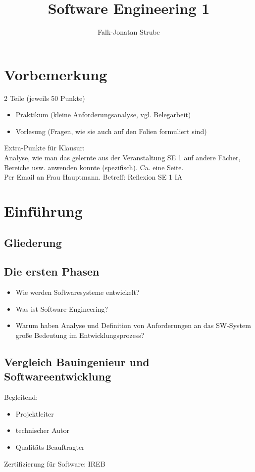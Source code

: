 \documentclass{scrreprt}
\title{Software Engineering 1}
\author{Falk-Jonatan Strube}
\begin{document}
\maketitle
\tableofcontents


\chapter*{Vorbemerkung}
2 Teile (jeweils 50 Punkte)
\begin{itemize}
\item Praktikum (kleine Anforderungsanalyse, vgl. Belegarbeit)
\item Vorlesung (Fragen, wie sie auch auf den Folien formuliert sind)
\end{itemize}
Extra-Punkte für Klausur:\\
Analyse, wie man das gelernte aus der Veranstaltung SE 1 auf andere Fächer, Bereiche usw. anwenden konnte (spezifisch). Ca. eine Seite.\\
Per Email an Frau Hauptmann. Betreff: Reflexion SE 1 IA

\chapter{Einführung}

\section{Gliederung}

\section{Die ersten Phasen}
\begin{itemize}
\item Wie werden Softwaresysteme entwickelt?
\item Was ist Software-Engineering?
\item Warum haben Analyse und Definition von Anforderungen an das SW-System große Bedeutung im Entwicklungsprozess?
\end{itemize}

\section{Vergleich Bauingenieur und Softwareentwicklung}
Begleitend:
\begin{itemize}
\item Projektleiter
\item technischer Autor
\item Qualitäts-Beauftragter
\end{itemize}
Zertifizierung für Software: IREB
\end{document}
